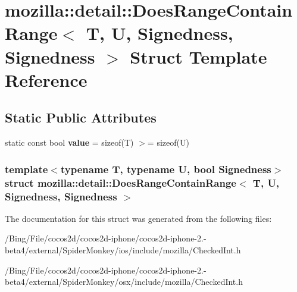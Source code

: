 \hypertarget{structmozilla_1_1detail_1_1_does_range_contain_range_3_01_t_00_01_u_00_01_signedness_00_01_signedness_01_4}{\section{mozilla\-:\-:detail\-:\-:Does\-Range\-Contain\-Range$<$ T, U, Signedness, Signedness $>$ Struct Template Reference}
\label{structmozilla_1_1detail_1_1_does_range_contain_range_3_01_t_00_01_u_00_01_signedness_00_01_signedness_01_4}
}
\subsection*{Static Public Attributes}
\begin{DoxyCompactItemize}
\item 
\hypertarget{structmozilla_1_1detail_1_1_does_range_contain_range_3_01_t_00_01_u_00_01_signedness_00_01_signedness_01_4_a07eff9138db943e2277f3015d7aaa6a5}{static const bool {\bfseries value} = sizeof(T) $>$= sizeof(U)}\label{structmozilla_1_1detail_1_1_does_range_contain_range_3_01_t_00_01_u_00_01_signedness_00_01_signedness_01_4_a07eff9138db943e2277f3015d7aaa6a5}

\end{DoxyCompactItemize}
\subsubsection*{template$<$typename T, typename U, bool Signedness$>$ struct mozilla\-::detail\-::\-Does\-Range\-Contain\-Range$<$ T, U, Signedness, Signedness $>$}



The documentation for this struct was generated from the following files\-:\begin{DoxyCompactItemize}
\item 
/\-Bing/\-File/cocos2d/cocos2d-\/iphone/cocos2d-\/iphone-\/2.-\/beta4/external/\-Spider\-Monkey/ios/include/mozilla/Checked\-Int.\-h\item 
/\-Bing/\-File/cocos2d/cocos2d-\/iphone/cocos2d-\/iphone-\/2.-\/beta4/external/\-Spider\-Monkey/osx/include/mozilla/Checked\-Int.\-h\end{DoxyCompactItemize}
